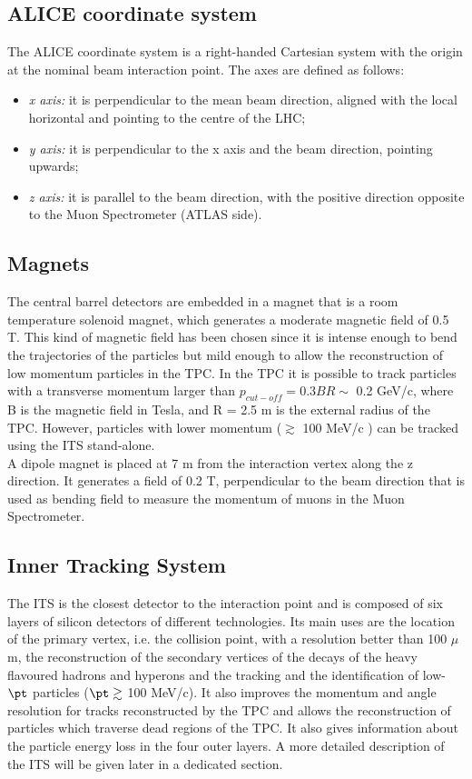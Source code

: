 \subsection{ALICE coordinate system}
The ALICE coordinate system is a right-handed Cartesian system with the origin at the nominal beam interaction point. The axes are defined as follows:
\begin{itemize}
 \item \textit{x axis:} it is perpendicular to the mean beam direction, aligned with the local horizontal and pointing to the centre of the LHC;
 \item \textit{y axis:} it is perpendicular to the x axis and the beam direction, pointing upwards;
 \item \textit{z axis:} it is parallel to the beam direction, with the positive direction opposite to the Muon Spectrometer (ATLAS side).
\end{itemize}
\subsection*{Magnets}
The central barrel detectors are embedded in a magnet that is a room temperature solenoid magnet, which generates a moderate magnetic field of 0.5 T. This kind of magnetic field has been chosen since it is intense enough to bend the trajectories of the particles but mild enough to allow the reconstruction of low momentum particles in the TPC. In the TPC it is possible to track particles with a transverse momentum larger than $p_{cut-off} = 0.3 BR \sim$ 0.2 GeV/c, where B is the magnetic field in Tesla, and R = 2.5 m is the external radius of the TPC. However, particles with lower momentum ($\gtrsim$ 100 MeV/c \cite{raro}) can be tracked using the ITS stand-alone.\\
A dipole magnet is placed at 7 m from the interaction vertex along the z direction. It generates a field of 0.2 T, perpendicular to the beam direction that is used as bending field to measure the momentum of muons in the Muon Spectrometer.
\subsection*{Inner Tracking System}
The ITS is the closest detector to the interaction point and is composed of six layers of silicon detectors of different technologies. Its main uses are the location of the primary vertex, i.e. the collision point, with a resolution better than 100 $\mu$m, the reconstruction of the secondary vertices of the decays of the heavy flavoured hadrons and hyperons and the tracking and the identification of low-$\pt$ particles ($\pt \gtrsim$  100 MeV/c). It also improves the momentum and angle resolution for tracks reconstructed by the TPC and allows the reconstruction of particles which traverse dead regions of the TPC. It also gives information about the particle energy loss in the four outer layers. A more detailed description of the ITS will be given later in a dedicated section.
